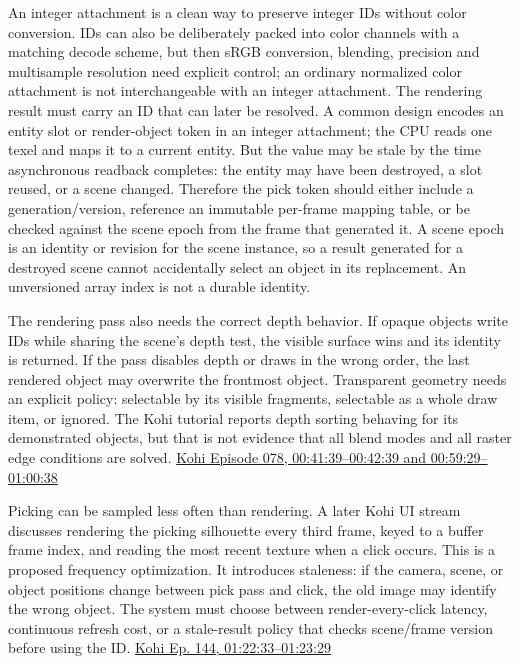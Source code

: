 An integer attachment is a clean way to preserve integer IDs without color conversion. IDs can also be deliberately packed into color channels with a matching decode scheme, but then sRGB conversion, blending, precision and multisample resolution need explicit control; an ordinary normalized color attachment is not interchangeable with an integer attachment. The rendering result must carry an ID that can later be resolved. A common design encodes an entity slot or render-object token in an integer attachment; the CPU reads one texel and maps it to a current entity. But the value may be stale by the time asynchronous readback completes: the entity may have been destroyed, a slot reused, or a scene changed. Therefore the pick token should either include a generation/version, reference an immutable per-frame mapping table, or be checked against the scene epoch from the frame that generated it. A scene epoch is an identity or revision for the scene instance, so a result generated for a destroyed scene cannot accidentally select an object in its replacement. An unversioned array index is not a durable identity.

The rendering pass also needs the correct depth behavior. If opaque objects write IDs while sharing the scene's depth test, the visible surface wins and its identity is returned. If the pass disables depth or draws in the wrong order, the last rendered object may overwrite the frontmost object. Transparent geometry needs an explicit policy: selectable by its visible fragments, selectable as a whole draw item, or ignored. The Kohi tutorial reports depth sorting behaving for its demonstrated objects, but that is not evidence that all blend modes and all raster edge conditions are solved. \href{https://www.youtube.com/watch?v=mx1TyxNFrdo&t=41m39s}{Kohi Episode 078, 00:41:39--00:42:39 and 00:59:29--01:00:38}

Picking can be sampled less often than rendering. A later Kohi UI stream discusses rendering the picking silhouette every third frame, keyed to a buffer frame index, and reading the most recent texture when a click occurs. This is a proposed frequency optimization. It introduces staleness: if the camera, scene, or object positions change between pick pass and click, the old image may identify the wrong object. The system must choose between render-every-click latency, continuous refresh cost, or a stale-result policy that checks scene/frame version before using the ID. \href{https://www.youtube.com/watch?v=YCYZtc2PrtY&t=1h22m33s}{Kohi Ep. 144, 01:22:33--01:23:29}

